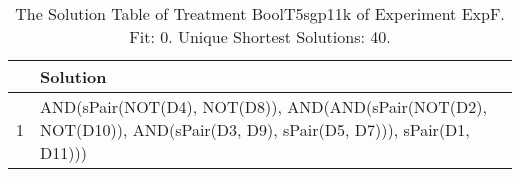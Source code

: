 \begin{table}[ht]
\centering
\begin{tabular}{rp{9cm}}
  \hline
 & Solution \\ 
  \hline
1 & AND(sPair(NOT(D4), NOT(D8)), AND(AND(sPair(NOT(D2), NOT(D10)), AND(sPair(D3, D9), sPair(D5, D7))), sPair(D1, D11))) \\ 
   \hline
\end{tabular}
\caption{The Solution Table of Treatment BoolT5sgp11k of Experiment ExpF. Fit: 0. Unique Shortest Solutions: 40.} 
\end{table}
